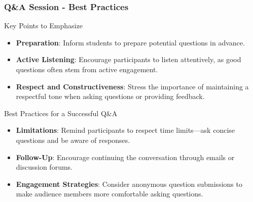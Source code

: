 \documentclass[aspectratio=169]{beamer}
\begin{document}
\begin{frame}[fragile]
    \frametitle{Q\&A Session - Best Practices}
    \begin{block}{Key Points to Emphasize}
        \begin{itemize}
            \item \textbf{Preparation}:
            Inform students to prepare potential questions in advance.
            
            \item \textbf{Active Listening}:
            Encourage participants to listen attentively, as good questions often stem from active engagement.
            
            \item \textbf{Respect and Constructiveness}:
            Stress the importance of maintaining a respectful tone when asking questions or providing feedback.
        \end{itemize}
    \end{block}
    
    \begin{block}{Best Practices for a Successful Q\&A}
        \begin{itemize}
            \item \textbf{Limitations}:
            Remind participants to respect time limits—ask concise questions and be aware of responses.
            \item \textbf{Follow-Up}:
            Encourage continuing the conversation through emails or discussion forums.
            \item \textbf{Engagement Strategies}:
            Consider anonymous question submissions to make audience members more comfortable asking questions.
        \end{itemize}
    \end{block}
\end{frame}
\end{document}
